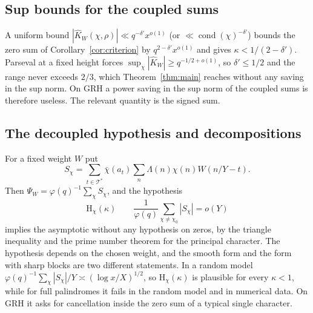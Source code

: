 \documentclass[11pt]{amsart}
\theoremstyle{definition}
\numberwithin{equation}{section}
\newcommand{\cT}{\mathcal{T}}
\begin{document}
\subsection{Sup bounds for the coupled sums}
A uniform bound $|\hat K_W(\chi,\rho)|\ll q^{-\delta'}x^{o(1)}$ (or $\ll\operatorname{cond}(\chi)^{-\delta'}$) bounds the zero sum of Corollary~\ref{cor:criterion} by $q^{2-\delta'}x^{o(1)}$ and gives $\kappa<1/(2-\delta')$. Parseval at a fixed height forces $\sup_\chi|\hat K_W|\ge q^{-1/2+o(1)}$, so $\delta'\le1/2$ and the range never exceeds $2/3$, which Theorem~\ref{thm:main} reaches without any saving in the sup norm. On GRH a power saving in the sup norm of the coupled sums is therefore useless. The relevant quantity is the signed sum.

\subsection{The decoupled hypothesis and decompositions}
For a fixed weight $W$ put
\[
S_\chi=\sum_{t\in\cT^*}\bar\chi(a_t)\sum_n\Lambda(n)\chi(n)W(n/Y-t).
\]
Then $\Psi_W=\varphi(q)^{-1}\sum_\chi S_\chi$, and the hypothesis
\[
\mathrm H_\chi(\kappa)\qquad\frac1{\varphi(q)}\sum_{\chi\ne\chi_0}|S_\chi|=o(Y)
\]
implies the asymptotic without any hypothesis on zeros, by the triangle inequality and the prime number theorem for the principal character. The hypothesis depends on the chosen weight, and the smooth form and the form with sharp blocks are two different statements. In a random model $\varphi(q)^{-1}\sum_\chi|S_\chi|/Y\asymp(\log x/X)^{1/2}$, so $\mathrm H_\chi(\kappa)$ is plausible for every $\kappa<1$, while for full palindromes it fails in the random model and in numerical data. On GRH it asks for cancellation inside the zero sum of a typical single character.
\end{document}

